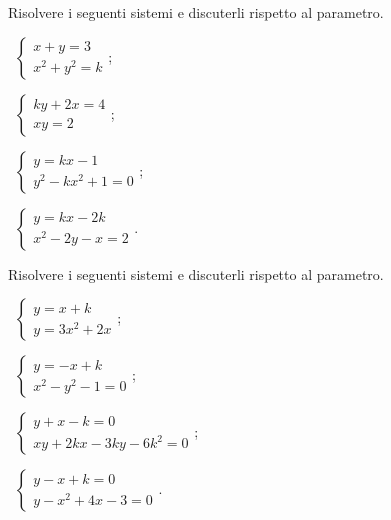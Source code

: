\begin{esercizio}[\Ast]
 \label{ese:6.14}
Risolvere i seguenti sistemi e discuterli rispetto al parametro.
\begin{multicols}{2}
 \begin{enumeratea}
 \item~$\left\{\begin{array}{l}x+y=3 \\x^2+y^2=k \end{array}\right.$;
 \item~$ \left\{\begin{array}{l}ky+2x=4\\xy=2\end{array}\right. $;
 \item~$ \left\{\begin{array}{l}y=kx-1 \\y^2-kx^2+1=0\end{array}\right. $;
 \item~$\left\{\begin{array}{l}y=kx-2k \\x^2-2y-x=2\end{array}\right.$.
 \end{enumeratea}
 \end{multicols}
\end{esercizio}

\begin{esercizio}[\Ast]
 \label{ese:6.15}
Risolvere i seguenti sistemi e discuterli rispetto al parametro.
\begin{multicols}{2}
 \begin{enumeratea}
 \item~$\left\{\begin{array}{l}y=x+k \\y=3x^2+2x\end{array}\right.$;
 \item~$ \left\{\begin{array}{l}y=-x+k \\x^2-y^2-1=0\end{array}\right. $;
 \item~$\left\{\begin{array}{l}y+x-k=0 \\{xy}+2{kx}-3{ky}-6k^2=0\end{array}\right.$;
 \item~$ \left\{\begin{array}{l}y-x+k=0 \\y-x^2+4x-3=0\end{array}\right. $.
 \end{enumeratea}
 \end{multicols}
\end{esercizio}


